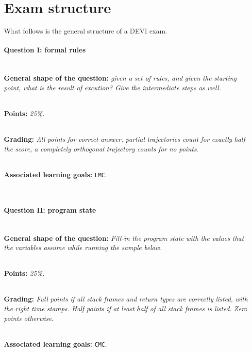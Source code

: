 \section*{Exam structure}
What follows is the general structure of a DEVI exam.

\paragraph{Question I: formal rules} \ \\

\textbf{General shape of the question:} \textit{given a set of rules, and given the starting point, what is the result of excution? Give the intermediate steps as well.}

\ \\ 

\textbf{Points:} \textit{25\%.}

\ \\ 

\textbf{Grading:} \textit{All points for correct answer, partial trajectories count for exactly half the score, a completely orthogonal trajectory counts for no points.}

\ \\ 

\textbf{Associated learning goals:} \texttt{LMC}.

\ \\ 

\paragraph{Question II: program state} \ \\ 

\textbf{General shape of the question:} \textit{Fill-in the program state with the values that the variables assume while running the sample below.}

\ \\ 

\textbf{Points:} \textit{25\%.}

\ \\ 

\textbf{Grading:} \textit{Full points if all stack frames and return types are correctly listed, with the right time stamps. Half points if at least half of all stack frames is listed. Zero points otherwise.}

\ \\ 

\textbf{Associated learning goals:} \texttt{CMC}.

